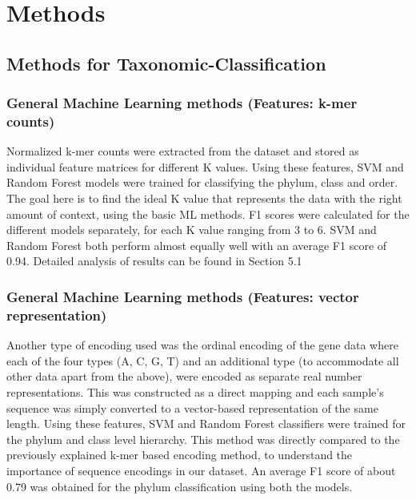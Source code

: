 \documentclass[12pt]{article}
\begin{document}
\section{Methods}
    \subsection{Methods for Taxonomic-Classification}
        \subsubsection{General Machine Learning methods (Features: k-mer counts)}
        Normalized k-mer counts were extracted from the dataset and stored as individual feature matrices for different K values. Using these features, SVM and Random Forest models were trained for classifying the phylum, class and order. The goal here is to find the ideal K value that represents the data with the right amount of context, using the basic ML methods. F1 scores were calculated for the different models separately, for each K value ranging from 3 to 6. SVM and Random Forest both perform almost equally well with an average F1 score of 0.94. Detailed analysis of results can be found in Section 5.1

        \subsubsection{General Machine Learning methods (Features: vector representation)}

        Another type of encoding used was the ordinal encoding of the gene data where each of the four types (A, C, G, T) and an additional type (to accommodate all other data apart from the above), were encoded as separate real number representations. This was constructed as a direct mapping and each sample's sequence was simply converted to a vector-based representation of the same length. Using these features, SVM and Random Forest classifiers were trained for the phylum and class level hierarchy. This method was directly compared to the previously explained k-mer based encoding method, to understand the importance of sequence encodings in our dataset. An average F1 score of about 0.79 was obtained for the phylum classification using both the models.
\end{document}
